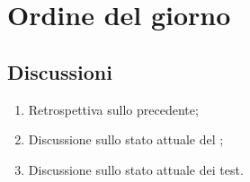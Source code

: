 \section{Ordine del giorno} \label{sec:agenda}
\subsection{Discussioni} \label{subsec:discussione}
\begin{enumerate}
    \item Retrospettiva sullo  precedente;
    \item Discussione sullo stato attuale del ;
    \item Discussione sullo stato attuale dei test.
\end{enumerate}
